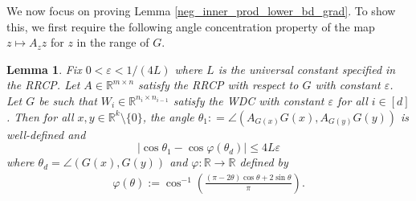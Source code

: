 \documentclass[11pt]{article}
\renewcommand{\epsilon}{\varepsilon}
\newcommand{\R}{\mathbb{R}}
\newcommand{\G}{G}
\newtheorem{lem}{Lemma}
\theoremstyle{remark}
\begin{document}
We now focus on proving Lemma \ref{neg_inner_prod_lower_bd_grad}. To show this, we first require the following angle concentration property of the map $z \mapsto A_zz$ for $z$ in the range of $\G$.  \begin{lem} \label{angle_distortion_property}
Fix $0 < \epsilon < 1/(4L)$ where $L$ is the universal constant specified in the RRCP. Let $A \in \R^{m \times n}$ satisfy the RRCP with respect to $\G$ with constant $\epsilon$. Let $\G$ be such that $W_{i} \in \R^{n_i \times n_{i-1}}$ satisfy the WDC with constant $\epsilon$ for all $i \in [d]$. Then for all $x,y \in \R^k \setminus \{0\}$, the angle $\theta_1 : = \angle(A_{\G(x)}\G(x) ,A_{\G(y)}\G(y))$ is well-defined and $$|\cos \theta_1 - \cos \varphi(\theta_d)| \leqslant 4L\epsilon$$ where $\theta_d = \angle(\G(x),\G(y))$ and $\varphi : \R \rightarrow \R$ defined by \begin{align*}
    \varphi(\theta):= \cos^{-1}\left(\frac{(\pi-2\theta)\cos\theta + 2\sin\theta}{\pi}\right).
\end{align*}
\end{lem}
\end{document}
